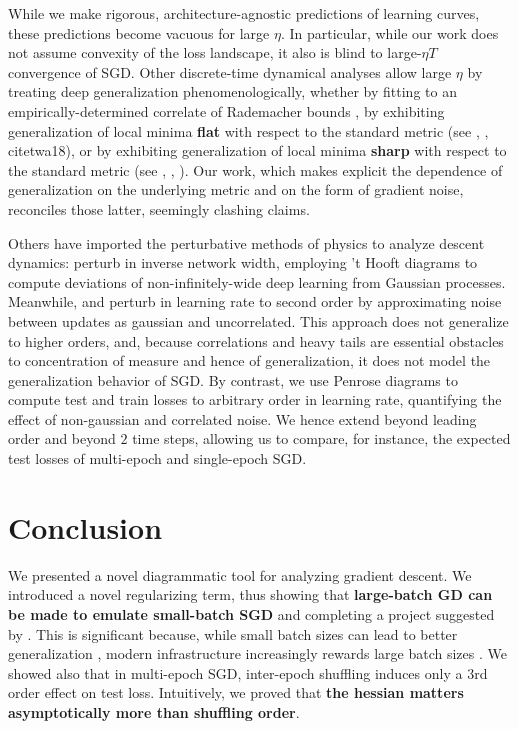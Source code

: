 \documentclass{article}
\begin{document}
    While we make rigorous, architecture-agnostic predictions of learning
    curves, these predictions become vacuous for large $\eta$.  In particular,
    while our work does not assume convexity of the loss landscape, it also is
    blind to large-$\eta T$ convergence of SGD.  Other discrete-time dynamical
    analyses allow large $\eta$ by treating deep generalization
    phenomenologically, whether by fitting to an empirically-determined
    correlate of Rademacher bounds \citep{li18}, by exhibiting generalization
    of local minima {\bf flat} with respect to the standard metric (see
    \citet{ho17}, \citet{ke17}, citet{wa18}), or by exhibiting generalization
    of local minima {\bf sharp} with respect to the standard metric (see
    \citet{st56}, \citet{di17}, \citet{wu18}).  Our work, which makes explicit
    the dependence of generalization on the underlying metric and on the form
    of gradient noise, reconciles those latter, seemingly clashing claims.
    
    Others have imported the perturbative methods of physics to analyze descent
    dynamics:  \citet{dy19} perturb in inverse network width, employing 't
    Hooft diagrams to compute deviations of non-infinitely-wide deep learning
    from Gaussian processes.  Meanwhile, \cite{ch18} and \citet{li17} perturb
    in learning rate to second order by approximating noise between updates as
    gaussian and uncorrelated.  This approach does not generalize to higher
    orders, and, because correlations and heavy tails are essential obstacles
    to concentration of measure and hence of generalization, it does not model
    the generalization behavior of SGD.  By contrast, we use Penrose diagrams
    to compute test and train losses to arbitrary order in learning rate,
    quantifying the effect of non-gaussian and correlated noise.  We hence
    extend \citet{ro18} beyond leading order and beyond $2$ time steps,
    allowing us to compare, for instance, the expected test losses of
    multi-epoch and single-epoch SGD.




\section{Conclusion}
    We presented a novel diagrammatic tool for analyzing gradient
    descent.  We introduced a novel regularizing term, thus showing that {\bf
    large-batch GD can be made to emulate small-batch SGD} and completing a
    project suggested by \citet{ro18}.  This is significant because, while
    small batch sizes can lead to better generalization \citep{bo91}, modern
    infrastructure increasingly rewards large batch sizes \citep{go18}.      
    We showed also that in multi-epoch SGD, inter-epoch shuffling induces only
    a $3$rd order effect on test loss.  Intuitively, we proved that {\bf the
    hessian matters asymptotically more than shuffling order}.
\end{document}
